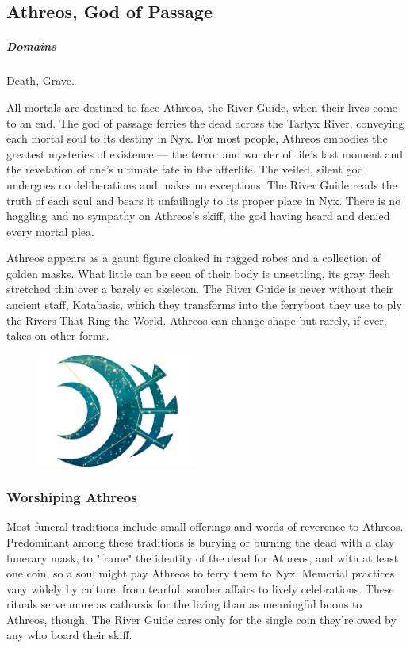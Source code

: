 \subsection*{Athreos, God of Passage} \label{ssec::athreos}
    \subparagraph{Domains} Death, Grave.

    All mortals are destined to face Athreos, the River Guide, when their lives come to an end.
    The god of passage ferries the dead across the Tartyx River, conveying each mortal soul to its destiny in Nyx.
    For most people, Athreos embodies the greatest mysteries of existence --- the terror and wonder of life's last moment and the revelation of one's ultimate fate in the afterlife.
    The veiled, silent god undergoes no deliberations and makes no exceptions.
    The River Guide reads the truth of each soul and bears it unfailingly to its proper place in Nyx.
    There is no haggling and no sympathy on Athreos's skiff, the god having heard and denied every mortal plea.

    Athreos appears as a gaunt figure cloaked in ragged robes and a collection of golden masks.
    What little can be seen of their body is unsettling, its gray flesh stretched thin over a barely et skeleton.
    The River Guide is never without their ancient staff, Katabasis, which they transforms into the ferryboat they use to ply the Rivers That Ring the World.
    Athreos can change shape but rarely, if ever, takes on other forms.

    \begin{figure}[t]
        \centering
        \includegraphics[width=0.47\textwidth]{02viphoger/img/10s_athreos.png}
    \end{figure}

    \subsubsection{Worshiping Athreos}
        Most funeral traditions include small offerings and words of reverence to Athreos.
        Predominant among these traditions is burying or burning the dead with a clay funerary mask, to "frame" the identity of the dead for Athreos, and with at least one coin, so a soul might pay Athreos to ferry them to Nyx.
        Memorial practices vary widely by culture, from tearful, somber affairs to lively celebrations.
        These rituals serve more as catharsis for the living than as meaningful boons to Athreos, though.
        The River Guide cares only for the single coin they're owed by any who board their skiff.

